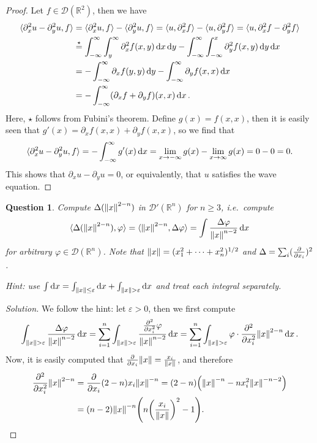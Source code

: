 \documentclass{article}
\theoremstyle{plain}
\newtheorem{question}{Question}
\theoremstyle{remark}
\newenvironment{solution}{\begin{proof}[Solution]\renewcommand\qedsymbol{}}{\end{proof}}
\renewcommand{\epsilon}{\varepsilon}
\renewcommand{\phi}{\varphi}
\newcommand{\Bb}{\mathbb}
\newcommand{\Cal}{\mathcal}
\newcommand{\RR}{\Bb R}
\newcommand{\DD}{\Cal D}
\DeclarePairedDelimiter{\ang}{\langle}{\rangle}
\newcommand\eps\epsilon
\newcommand\pt\partial
\begin{document}
\begin{proof}
	Let $f \in \DD(\RR^2)$, then we have
	\begin{align*}
		\ang{\pt_x^2 u - \pt_y^2 u, f} &= \ang{\pt_x^2 u, f}- \ang{\pt_y^2 u, f} = \ang{u, \pt_x^2 f} - \ang{u, \pt_y^2 f} = \ang{u, \pt_x^2 f - \pt_y^2 f} \\
		&\overset\star= \int_{-\infty}^\infty \int_{y}^\infty \pt_x^2 f(x, y) \dd{x}\dd{y} - \int_{-\infty}^\infty \int_{-\infty}^x \pt_y^2 f(x, y) \dd{y} \dd{x} \\
		&= - \int_{-\infty}^\infty \pt_x f(y, y) \dd{y} - \int_{-\infty}^\infty \pt_y f(x, x) \dd{x}
		\\
		&= - \int_{-\infty}^\infty (\pt_xf + \pt_yf)(x, x) \dd{x}.
	\end{align*}
Here, $\star$ follows from Fubini's theorem. 
Define $g(x) = f(x, x)$, then it is easily seen that $g'(x) = \pt_x f(x, x) + \pt_y f(x, x)$, so we find that
\[
\ang{\pt_x^2 u - \pt_y^2 u, f} = 
- \int_{-\infty}^\infty g'(x) \dd{x} = \lim_{x\to -\infty} g(x) - \lim_{x\to\infty} g(x) = 0 - 0 = 0. 
\]
This shows that $\pt_x u - \pt_y u = 0$, or equivalently, that $u$ satisfies the wave equation. 
\end{proof}

\begin{question}
	Compute $\Delta(\norm{x}^{2-n})$ in $\DD'(\RR^n)$ for $n \geq 3$, i.e.\ compute
	\[
	\ang{\Delta (\norm{x}^{2-n}), \phi} = \ang{\norm{x}^{2-n}, \Delta\phi} = \int \frac{\Delta\phi}{\norm{x}^{n-2}} \dd{x}
	\]
	for arbitrary $\phi \in \DD(\RR^n)$. Note that $\norm{x} = (x_1^2 +\dotsb +x_n^2)^{1/2}$ and $\Delta = \sum_i (\pdv{x_i})^2$. 
	
	\emph{Hint:} use $\int\dd{x} = \int_{\norm{x}\leq\eps}\dd{x} + \int_{\norm{x}>\eps}\dd{x}$ and treat each integral separately. 
\end{question}

\begin{solution}
	We follow the hint: let $\eps > 0$, then we first compute
	\[
	\int_{\norm{x} > \eps} \frac{\Delta\phi}{\norm{x}^{n-2}} \dd{x} = \sum_{i=1}^n \int_{\norm{x} > \eps} \frac{\pdv[2]{x_i} \phi}{\norm{x}^{n-2}}\dd{x} = \sum_{i=1}^n \int_{\norm{x} > \eps} \phi \cdot \pdv[2]{x_i} \norm{x}^{2-n} \dd{x}. 
	\]
	Now, it is easily computed that $\pdv{x_i} \norm{x} = \frac{x_i}{\norm{x}}$, and therefore 
	\begin{align*}
	\pdv[2]{x_i} \norm{x}^{2-n} &= \pdv{x_i} (2-n) x_i \norm{x}^{-n} = (2-n) \qty(\norm{x}^{-n} - n x_i^2 \norm{x}^{-n-2}) \\
	&= (n-2)\norm{x}^{-n} \qty(n \qty(\frac{x_i}{\norm{x}})^2 - 1). 
	\end{align*}
\end{solution}
\end{document}

